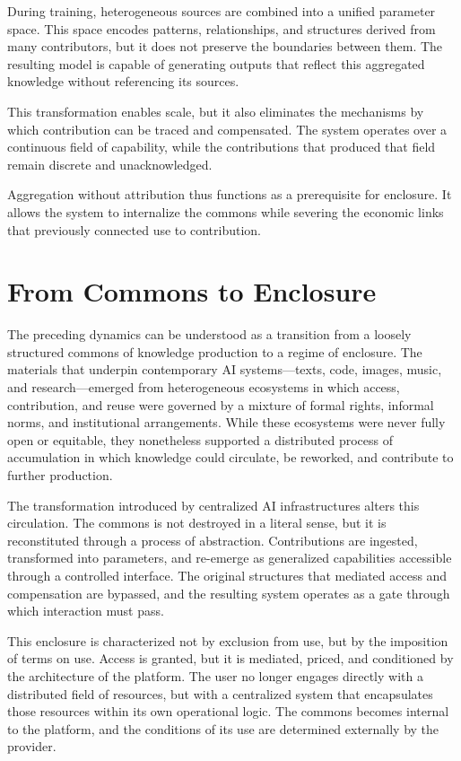 \documentclass[12pt, oneside]{article}
\begin{document}
During training, heterogeneous sources are combined into a unified parameter space. This space encodes patterns, relationships, and structures derived from many contributors, but it does not preserve the boundaries between them. The resulting model is capable of generating outputs that reflect this aggregated knowledge without referencing its sources.

This transformation enables scale, but it also eliminates the mechanisms by which contribution can be traced and compensated. The system operates over a continuous field of capability, while the contributions that produced that field remain discrete and unacknowledged.

Aggregation without attribution thus functions as a prerequisite for enclosure. It allows the system to internalize the commons while severing the economic links that previously connected use to contribution.

\section{From Commons to Enclosure}

The preceding dynamics can be understood as a transition from a loosely structured commons of knowledge production to a regime of enclosure. The materials that underpin contemporary AI systems---texts, code, images, music, and research---emerged from heterogeneous ecosystems in which access, contribution, and reuse were governed by a mixture of formal rights, informal norms, and institutional arrangements. While these ecosystems were never fully open or equitable, they nonetheless supported a distributed process of accumulation in which knowledge could circulate, be reworked, and contribute to further production.

The transformation introduced by centralized AI infrastructures alters this circulation. The commons is not destroyed in a literal sense, but it is reconstituted through a process of abstraction. Contributions are ingested, transformed into parameters, and re-emerge as generalized capabilities accessible through a controlled interface. The original structures that mediated access and compensation are bypassed, and the resulting system operates as a gate through which interaction must pass.

This enclosure is characterized not by exclusion from use, but by the imposition of terms on use. Access is granted, but it is mediated, priced, and conditioned by the architecture of the platform. The user no longer engages directly with a distributed field of resources, but with a centralized system that encapsulates those resources within its own operational logic. The commons becomes internal to the platform, and the conditions of its use are determined externally by the provider.
\end{document}

